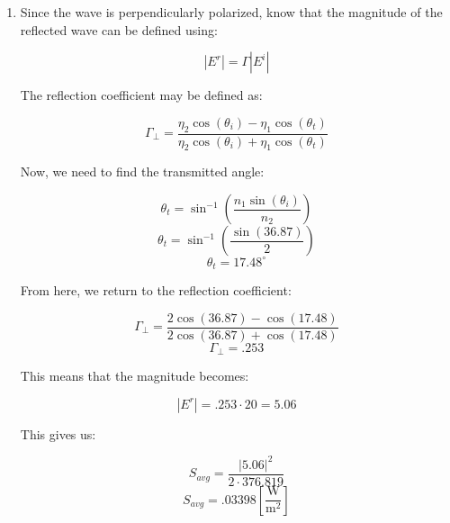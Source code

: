 \begin{enumerate}
\begin{enumerate}
      \item 

        Since the wave is perpendicularly polarized, know that the magnitude of the reflected wave can be defined using:

        $$|E^r|=\Gamma|E^i|$$

        The reflection coefficient may be defined as:

        $$\Gamma_{\perp}=\frac{\eta_2\cos(\theta_i)-\eta_1\cos(\theta_t)}{\eta_2\cos(\theta_i)+\eta_1\cos(\theta_t)}$$

        Now, we need to find the transmitted angle:

        $$\theta_t=\sin^{-1}\left( \frac{n_1\sin(\theta_i)}{n_2} \right)$$
        $$\theta_t=\sin^{-1}\left( \frac{\sin(36.87)}{2} \right)$$
        $$\theta_t=17.48^{\circ}$$

        From here, we return to the reflection coefficient:

        $$\Gamma_{\perp}=\frac{2\cos(36.87)-\cos(17.48)}{2\cos(36.87)+\cos(17.48)}$$
        $$\Gamma_{\perp}=.253$$

        This means that the magnitude becomes:

        $$|E^r|=.253\cdot20=5.06$$

        This gives us:

        $$S_{avg}=\frac{|5.06|^2}{2\cdot376.819}$$
        $$\boxed{S_{avg}=.03398\left[ \frac{\si{\watt}}{\si{\meter\squared}} \right]}$$

    \end{enumerate}

\end{enumerate}



